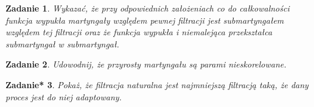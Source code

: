 \documentclass{mwart}
\newtheorem{zd}{Zadanie}
\newtheorem{zdt}[zd]{Zadanie*}
\begin{document}
\begin{zd}
Wykazać, że przy odpowiednich założeniach co do całkowalności funkcja wypukła martyngały względem pewnej filtracji jest submartyngałem względem tej filtracji oraz że funkcja wypukła i niemalejąca przekształca submartyngał w submartyngał.
\end{zd}

\begin{zd}
Udowodnij, że przyrosty martyngału są parami nieskorelowane.
\end{zd}

\begin{zdt}
Pokaż, że filtracja naturalna jest najmniejszą filtracją taką, że dany proces jest do niej adaptowany.
\end{zdt}
\end{document}
